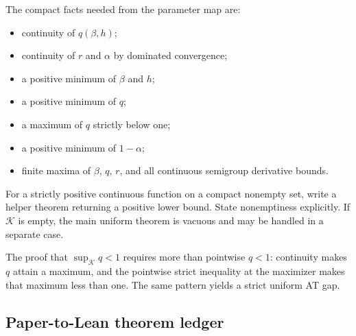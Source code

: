 \documentclass[11pt]{article}
\numberwithin{equation}{section}
\newcommand{\1}{\mathbf 1}
\begin{document}
The compact facts needed from the parameter map are:
\begin{itemize}[leftmargin=2em]
\item continuity of $q(\beta,h)$;
\item continuity of $r$ and $\alpha$ by dominated convergence;
\item a positive minimum of $\beta$ and $h$;
\item a positive minimum of $q$;
\item a maximum of $q$ strictly below one;
\item a positive minimum of $1-\alpha$;
\item finite maxima of $\beta$, $q$, $r$, and all continuous semigroup
      derivative bounds.
\end{itemize}
For a strictly positive continuous function on a compact nonempty set,
write a helper theorem returning a positive lower bound.  State
nonemptiness explicitly.  If $\mathcal K$ is empty, the main uniform theorem
is vacuous and may be handled in a separate case.

The proof that $\sup_{\mathcal K}q<1$ requires more than pointwise $q<1$:
continuity makes $q$ attain a maximum, and the pointwise strict inequality at
the maximizer makes that maximum less than one.  The same pattern yields a
strict uniform AT gap.

\subsection{Paper-to-Lean theorem ledger}
\end{document}
